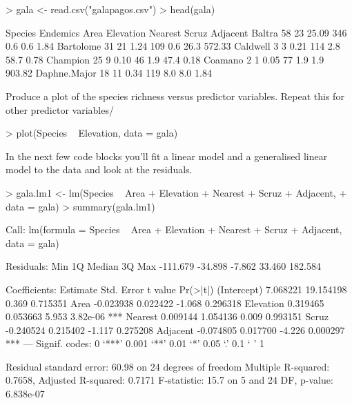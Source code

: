\documentclass[a4paper,10pt]{article}
\begin{document}
\begin{Schunk}
\begin{Sinput}
> gala <- read.csv("galapagos.csv")
> head(gala)
\end{Sinput}
\begin{Soutput}
             Species Endemics  Area Elevation Nearest Scruz Adjacent
Baltra            58       23 25.09       346     0.6   0.6     1.84
Bartolome         31       21  1.24       109     0.6  26.3   572.33
Caldwell           3        3  0.21       114     2.8  58.7     0.78
Champion          25        9  0.10        46     1.9  47.4     0.18
Coamano            2        1  0.05        77     1.9   1.9   903.82
Daphne.Major      18       11  0.34       119     8.0   8.0     1.84
\end{Soutput}
\end{Schunk}

Produce a plot of the species richness versus predictor variables. Repeat this for other predictor variables/

\begin{Schunk}
\begin{Sinput}
> plot(Species ~ Elevation, data = gala)
\end{Sinput}
\end{Schunk}

In the next few code blocks you'll fit a linear model and a generalised linear model to the data and look at the residuals.

\begin{Schunk}
\begin{Sinput}
> gala.lm1 <- lm(Species ~ Area + Elevation + Nearest + Scruz + Adjacent,
+                data = gala)
> summary(gala.lm1)
\end{Sinput}
\begin{Soutput}
Call:
lm(formula = Species ~ Area + Elevation + Nearest + Scruz + Adjacent, 
    data = gala)

Residuals:
     Min       1Q   Median       3Q      Max 
-111.679  -34.898   -7.862   33.460  182.584 

Coefficients:
             Estimate Std. Error t value Pr(>|t|)    
(Intercept)  7.068221  19.154198   0.369 0.715351    
Area        -0.023938   0.022422  -1.068 0.296318    
Elevation    0.319465   0.053663   5.953 3.82e-06 ***
Nearest      0.009144   1.054136   0.009 0.993151    
Scruz       -0.240524   0.215402  -1.117 0.275208    
Adjacent    -0.074805   0.017700  -4.226 0.000297 ***
---
Signif. codes:  0 ‘***’ 0.001 ‘**’ 0.01 ‘*’ 0.05 ‘.’ 0.1 ‘ ’ 1

Residual standard error: 60.98 on 24 degrees of freedom
Multiple R-squared:  0.7658,	Adjusted R-squared:  0.7171 
F-statistic:  15.7 on 5 and 24 DF,  p-value: 6.838e-07
\end{Soutput}
\end{Schunk}
\end{document}
